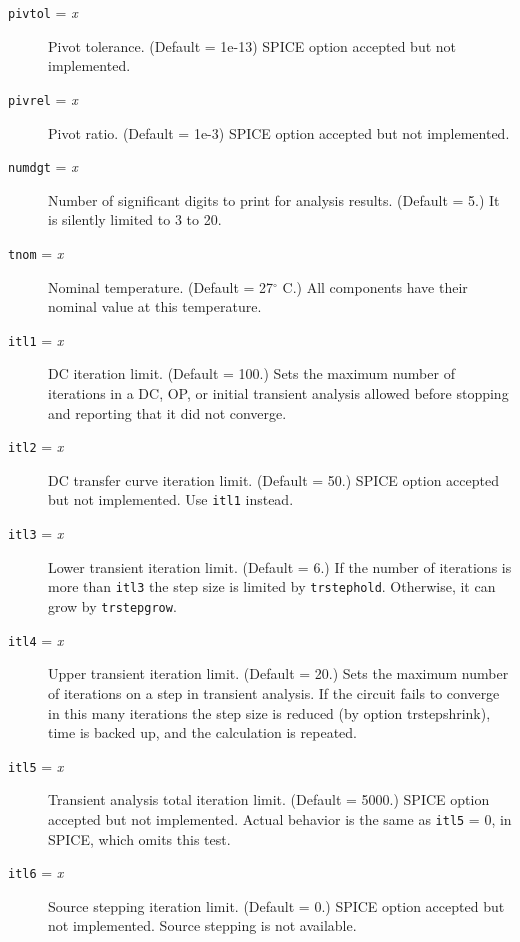 \begin{description}
\item[{\tt pivtol} = {\it x}] Pivot tolerance.  (Default =
1e-13) SPICE option accepted but not implemented.

\item[{\tt pivrel} = {\it x}] Pivot ratio.  (Default = 1e-3)
SPICE option accepted but not implemented.

\item[{\tt numdgt} = {\it x}] Number of significant digits to print
for analysis results.  (Default = 5.)  It is silently limited to 3
to 20.

\item[{\tt tnom} = {\it x}]
Nominal temperature.  (Default = 27$^{\circ}$ C.)  All components have
their nominal value at this temperature.

\item[{\tt itl1} = {\it x}] DC iteration limit.  (Default = 100.)
Sets the maximum number of iterations in a DC, OP, or initial
transient analysis allowed before stopping and reporting that it
did not converge.

\item[{\tt itl2} = {\it x}] DC transfer curve iteration limit.
(Default = 50.)  SPICE option accepted but not implemented.
Use {\tt itl1} instead.

\item[{\tt itl3} = {\it x}] Lower transient iteration limit.
(Default = 6.)  If the number of iterations is more than {\tt itl3}
the step size is limited by {\tt trstephold}.  Otherwise,
it can grow by {\tt trstepgrow}.

\item[{\tt itl4} = {\it x}] Upper transient iteration limit.
(Default = 20.)  Sets the maximum number of iterations on a step
in transient analysis.  If the circuit fails to converge in this
many iterations the step size is reduced (by option trstepshrink),
time is backed up, and the calculation is repeated.

\item[{\tt itl5} = {\it x}] Transient analysis total iteration
limit.  (Default = 5000.)  SPICE option accepted but not
implemented.  Actual behavior is the same as {\tt itl5} = 0, in
SPICE, which omits this test.

\item[{\tt itl6} = {\it x}] Source stepping iteration limit.
(Default = 0.)  SPICE option accepted but not implemented.
Source stepping is not available.


\end{description}

